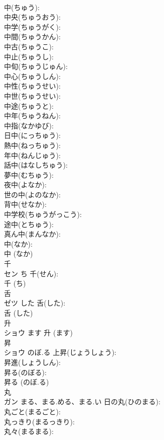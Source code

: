 \documentclass[8pt]{extreport}
\begin{document}
\begin{CJK}{UTF8}{min}
\\	中(ちゅう): 
\\	中央(ちゅうおう): 
\\	中学(ちゅうがく): 
\\	中間(ちゅうかん): 
\\	中古(ちゅうこ): 
\\	中止(ちゅうし): 
\\	中旬(ちゅうじゅん): 
\\	中心(ちゅうしん): 
\\	中性(ちゅうせい): 
\\	中世(ちゅうせい): 
\\	中途(ちゅうと): 
\\	中年(ちゅうねん): 
\\	中指(なかゆび): 
\\	日中(にっちゅう): 
\\	熱中(ねっちゅう): 
\\	年中(ねんじゅう): 
\\	話中(はなしちゅう): 
\\	夢中(むちゅう): 
\\	夜中(よなか): 
\\	世の中(よのなか): 
\\	背中(せなか): 
\\	中学校(ちゅうがっこう): 
\\	途中(とちゅう): 
\\	真ん中(まんなか): 
\\	中(なか): 
\\	中 (なか)
\\	千			
\\	セン	ち	千(せん): 
\\	千 (ち)
\\	舌			
\\	ゼツ	した	舌(した): 
\\	舌 (した)
\\	升			
\\	ショウ	ます		升 (ます)
\\	昇			
\\	ショウ	のぼ.る	上昇(じょうしょう): 
\\	昇進(しょうしん): 
\\	昇る(のぼる): 
\\	昇る (のぼ.る)
\\	丸			
\\	ガン	まる、まる.める、まる.い	日の丸(ひのまる): 
\\	丸ごと(まるごと): 
\\	丸っきり(まるっきり): 
\\	丸々(まるまる): 

\end{CJK}
\end{document}
